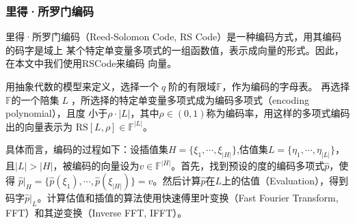 \documentclass[zihao=-4]{ctexart}
\begin{document}
\begin{spacing}{1.5}
\subsubsection{里得·所罗门编码}
里得·所罗门编码（Reed-Solomon Code, RS Code）是一种编码方式，用其编码的码字是域上
某个特定单变量多项式的一组函数值，表示成向量的形式。因此，在本文中我们使用RS\;Code来编码
向量。\par
用抽象代数的模型来定义，选择一个$\;q\;$阶的有限域$\mathbb{F}$，作为编码的字母表。
再选择$\mathbb{F}$的一个陪集$\;L\;$，所选择的特定单变量多项式成为编码多项式（encoding polynomial），且度
小于$\rho\cdot|L|$，其中$\rho\in(0,1)$称为编码率，用这样的多项式编码出的向量表示为
$\text{RS}[L,\rho]\in\mathbb{F}^{|L|}$。\par
具体而言，编码的过程如下：设插值集$H=\{\xi_1,\cdots,\xi_{|H|}\}$,估值集$L=\{\eta_1,\cdots,\eta_{|L|}\}$，
且$|L|>|H|$，被编码的向量设为$v\in\mathbb{F}^{|H|}$。首先，找到预设的度的编码多项式$\hat{p}$，使得
$\hat{p}|_H=\{\hat{p}(\xi_1),\cdots,\hat{p}(\xi_{|H|})\}=v$。然后计算$\hat{p}$在$L$上的估值（Evaluation），得到
码字$\hat{p}|_L$。计算估值和插值的算法使用快速傅里叶变换（Fast Fourier Transform, FFT）和其逆变换（Inverse FFT, IFFT）。


\end{spacing}
\end{document}
